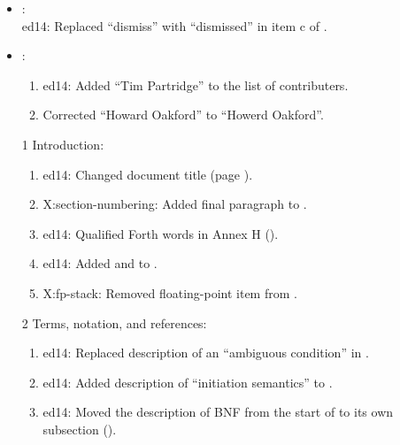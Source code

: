 	\begin{itemize}
	\item {}:							%
		~\\ \textsf{ed14}: Replaced ``dismiss'' with ``dismissed'' in item c of .

	\item {}:							%
		\begin{enumerate}
		\item \textsf{ed14}: Added ``Tim Partridge'' to the list of contributers.
		\item Corrected ``Howard Oakford'' to ``Howerd Oakford''.
	\end{enumerate}

	\item[1] Introduction:							%
		\begin{enumerate}
		\item \textsf{ed14}: Changed document title (page \pageref{chap:intro}).
		\item \textsf{X:section-numbering}: Added final paragraph to .
		\item \textsf{ed14}: Qualified Forth words in Annex H ().
		\item \textsf{ed14}: Added \word{[COMPILE]} and  to .
		\item \textsf{X:fp-stack}: Removed floating-point item from .
		\end{enumerate}

	\item[2] Terms, notation, and references:		%
		\begin{enumerate}
		\item \textsf{ed14}: Replaced description of an ``ambiguous condition'' in
			.
		\item \textsf{ed14}: Added description of ``initiation semantics'' to
			.
		\item \textsf{ed14}: Moved the description of BNF from the start of
			 to its own subsection ().
		\end{enumerate}


\end{itemize}

